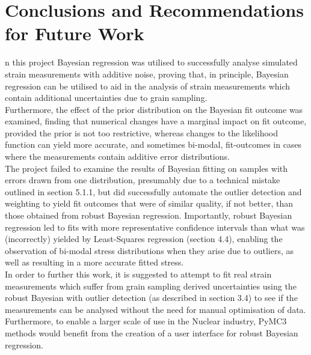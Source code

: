 %
%
\let\textcircled=\pgftextcircled
\chapter{Conclusions and Recommendations for Future Work}
\label{chap:intro}

n this project Bayesian regression was utilised to successfully analyse simulated strain measurements with additive noise, proving that, in principle, Bayesian regression can be utilised to aid in the analysis of strain measurements which contain additional uncertainties due to grain sampling.\\

Furthermore, the effect of the prior distribution on the Bayesian fit outcome was examined, finding that numerical changes have a marginal impact on fit outcome, provided the prior is not too restrictive, whereas changes to the likelihood function can yield more accurate, and sometimes bi-modal, fit-outcomes in cases where the measurements contain additive error distributions.\\

The project failed to examine the results of Bayesian fitting on samples with errors drawn from one distribution, presumably due to a technical mistake outlined in section 5.1.1, but did successfully automate the outlier detection and weighting to yield fit outcomes that were of similar quality, if not better, than those obtained from robust Bayesian regression. Importantly, robust Bayesian regression led to fits with more representative confidence intervals than what was (incorrectly) yielded by Least-Squares regression (section 4.4), enabling the observation of bi-modal stress distributions when they arise due to outliers, as well as resulting in a more accurate fitted stress.\\

In order to further this work, it is suggested to attempt to fit real strain measurements which suffer from grain sampling derived uncertainties using the robust Bayesian with outlier detection (as described in section 3.4) to see if the measurements can be analysed without the need for manual optimisation of data. Furthermore, to enable a larger scale of use in the Nuclear industry, PyMC3 methods would benefit from the creation of a user interface for robust Bayesian regression. 

